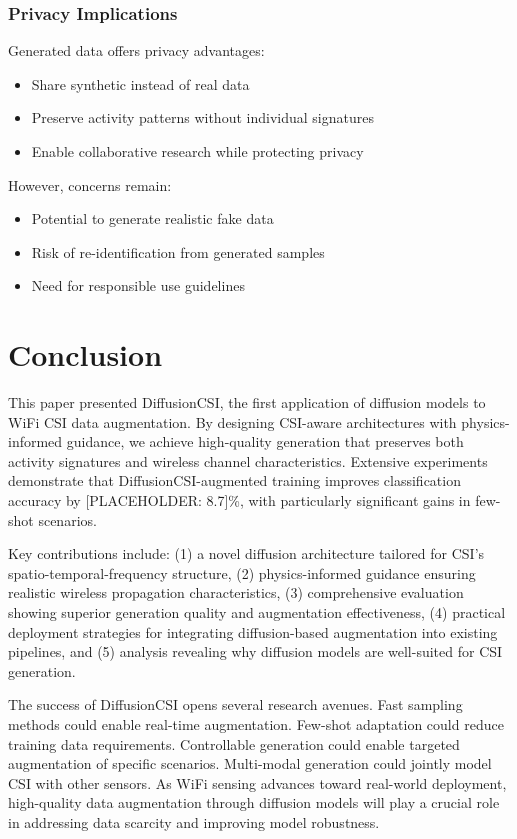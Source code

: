 \documentclass[journal]{IEEEtran}
\begin{document}
\subsubsection{Privacy Implications}
Generated data offers privacy advantages:
\begin{itemize}
\item Share synthetic instead of real data
\item Preserve activity patterns without individual signatures
\item Enable collaborative research while protecting privacy
\end{itemize}

However, concerns remain:
\begin{itemize}
\item Potential to generate realistic fake data
\item Risk of re-identification from generated samples
\item Need for responsible use guidelines
\end{itemize}

\section{Conclusion}

This paper presented DiffusionCSI, the first application of diffusion models to WiFi CSI data augmentation. By designing CSI-aware architectures with physics-informed guidance, we achieve high-quality generation that preserves both activity signatures and wireless channel characteristics. Extensive experiments demonstrate that DiffusionCSI-augmented training improves classification accuracy by [PLACEHOLDER: 8.7]\%, with particularly significant gains in few-shot scenarios.

Key contributions include: (1) a novel diffusion architecture tailored for CSI's spatio-temporal-frequency structure, (2) physics-informed guidance ensuring realistic wireless propagation characteristics, (3) comprehensive evaluation showing superior generation quality and augmentation effectiveness, (4) practical deployment strategies for integrating diffusion-based augmentation into existing pipelines, and (5) analysis revealing why diffusion models are well-suited for CSI generation.

The success of DiffusionCSI opens several research avenues. Fast sampling methods could enable real-time augmentation. Few-shot adaptation could reduce training data requirements. Controllable generation could enable targeted augmentation of specific scenarios. Multi-modal generation could jointly model CSI with other sensors. As WiFi sensing advances toward real-world deployment, high-quality data augmentation through diffusion models will play a crucial role in addressing data scarcity and improving model robustness.
\end{document}
